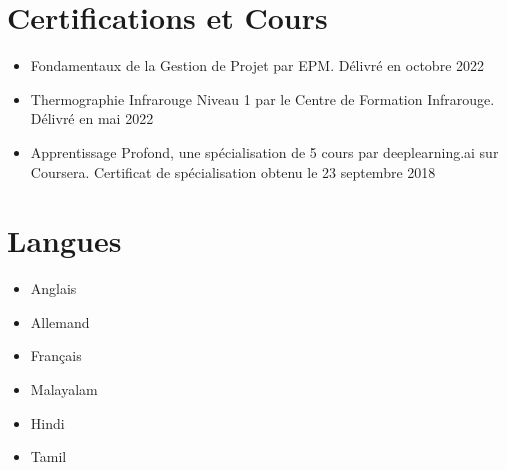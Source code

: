 \documentclass{my_cv}%
\begin{document}
\section{Certifications et Cours}
\vspace{1em}
\begin{itemize}[leftmargin=0.15in]
\setlength\itemsep{-0.1em}
\color{mygray}
\item[\faCertificate] Fondamentaux de la Gestion de Projet par EPM. Délivré en octobre 2022
\item[\faCertificate] Thermographie Infrarouge Niveau 1 par le Centre de Formation Infrarouge. Délivré en mai 2022
\item[\faCertificate] Apprentissage Profond, une spécialisation de 5 cours par deeplearning.ai sur Coursera. Certificat de spécialisation obtenu le 23 septembre 2018
\end{itemize}

\section{Langues}
\vspace{1em}
\noindent
\begin{minipage}{0.4\textwidth}
\begin{itemize}
\setlength\itemsep{0.0em}
\item[] Anglais  \hspace{0.5em}  
\item[] Allemand  \hspace{0.2em}  
\item[] Français  \hspace{0.8em} 
\end{itemize}
\end{minipage}
\begin{minipage}{0.4\textwidth}
\begin{itemize}
\setlength\itemsep{0.0em}
\item[] Malayalam  \hspace{0.5em}  
\item[] Hindi      \hspace{2.9em}  
\item[] Tamil      \hspace{2.9em} 
\end{itemize}
\end{minipage}
\vspace{2em}
\end{document}
